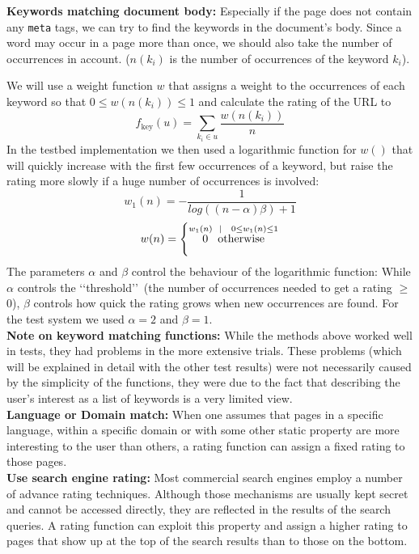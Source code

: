 \documentclass[a4paper,twoside]{danarticle}
\theoremstyle{remark}
\begin{document}
    \textbf{Keywords matching document body:} Especially if the page does not
    contain any \verb$meta$ tags, we can try to find the keywords in the
    document's body. Since a word may occur in a page more than once, we should
    also take the number of occurrences in account. ($ n(k_i) $ is the number of
    occurrences of the keyword $ k_i $).
    
    We will use a weight function $ w $ that assigns a weight to the occurrences
    of each keyword so that $ 0 \leq w(n(k_i)) \leq 1 $ and calculate the
    rating of the URL to
    \[
      f_{\mbox{key}}(u) = \sum_{k_i \in u} \frac{w(n(k_i))}{n}
    \]
    In the testbed implementation we then used a logarithmic function for 
    $w()$ that will quickly increase with the first few occurrences of a 
    keyword, but raise the rating more slowly if a huge number of occurrences is 
    involved:
    \[
      w_1(n) = - \frac{1}{log((n - \alpha) \beta) + 1}
    \]
    \[
      w(n) = \left\{
      \stackrel{w_1(n) \hspace{2mm} | \hspace{3mm} 0 \leq w_1(n) \leq 1}
      {0 \hspace{3mm} \mbox{otherwise}}
      \right.
    \]
    The parameters $ \alpha $ and $ \beta $ control the behaviour of the
    logarithmic function: While $ \alpha $ controls the \lq\lq threshold\rq\rq\
    (the number of occurrences needed to get a rating $ \geq $ 0), $ \beta $
    controls how quick the rating grows when new occurrences are found. For the
    test system we used $ \alpha = 2 $ and $ \beta = 1 $.
    \\
    
    \textbf{Note on keyword matching functions:} While the methods above worked
    well in tests, they had problems in the more extensive trials. These
    problems (which will be explained in detail with the other test results)
    were not necessarily caused by the simplicity of the functions, they were
    due to the fact that describing the user's interest as a list of keywords is
    a very limited view.
    \\
    
    \textbf{Language or Domain match:} When one assumes that pages in a specific 
    language, within a specific domain or with some other static property are 
    more interesting to the user than others, a rating function can assign a 
    fixed rating to those pages.
    \\
    
    \textbf{Use search engine rating:} Most commercial search engines employ a 
    number of advance rating techniques. Although those mechanisms are 
    usually kept secret and cannot be accessed directly, they are reflected in 
    the results of the search queries. A rating function can exploit this property 
    and assign a higher rating to pages that show up at the top of the search 
    results than to those on the bottom.
\end{document}
